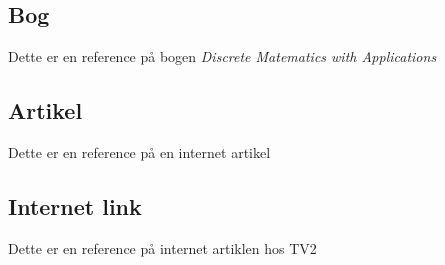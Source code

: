 \documentclass[11pt]{article}
\begin{document}
\subsection{Bog}
Dette er en reference på bogen \textit{Discrete Matematics with Applications} \cite{koshy2004discrete}
\subsection{Artikel}
Dette er en reference på en internet artikel \cite{choy2003development}

\subsection{Internet link}
Dette er en reference på internet artiklen hos TV2 \cite{tv2}
\clearpage


\end{document}
